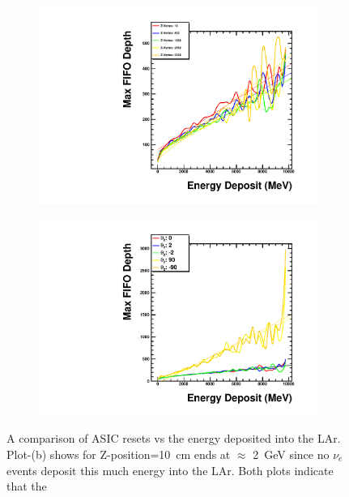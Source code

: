 \begin{figure}
\centering
\begin{subfigure}{.5\textwidth}
  \centering
  \includegraphics[width=\textwidth]{images/Const_Theta0_ASIC_EnergyDep_multigraph_pdg12_fhc.pdf}
  \caption{}
\end{subfigure}%
\begin{subfigure}{.5\textwidth}
  \centering
  \includegraphics[width=\textwidth]{images/Const_Z180_ASIC_EnergyDep_multigraph_pdg12_fhc.pdf}
  \caption{}
\end{subfigure}
\caption{A comparison of ASIC resets vs the energy deposited into the LAr.
Plot-(b) shows for Z-position=10~\unit{cm} ends at $\approx$ 2~\unit{GeV} since no $\nu_{e}$ events deposit this much energy into the LAr.
Both plots indicate that the 
}
\label{fig:compare_energy_deposit}
\end{figure}

